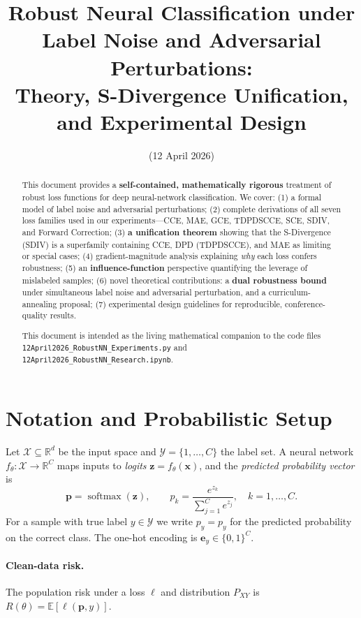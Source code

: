 \documentclass[11pt,a4paper]{article}
\title{\textbf{Robust Neural Classification under Label Noise and Adversarial Perturbations:}\\
Theory, S-Divergence Unification, and Experimental Design}
\author{(12 April 2026)}
\date{}
\newcommand{\softmax}{\operatorname{softmax}}
\newcommand{\R}{\mathbb{R}}
\newcommand{\E}{\mathbb{E}}
\newcommand{\py}{p_y}
\newcommand{\pb}{\mathbf{p}}
\newcommand{\zb}{\mathbf{z}}
\newcommand{\xb}{\mathbf{x}}
\newcommand{\eb}{\mathbf{e}}
\begin{document}
\maketitle

\begin{abstract}
This document provides a \textbf{self-contained, mathematically rigorous} treatment of robust loss functions for deep neural-network classification. We cover:
(1) a formal model of label noise and adversarial perturbations;
(2) complete derivations of all seven loss families used in our experiments—CCE, MAE, GCE, TDPDSCCE, SCE, SDIV, and Forward Correction;
(3) \textbf{a unification theorem} showing that the S-Divergence (SDIV) is a superfamily containing CCE, DPD (TDPDSCCE), and MAE as limiting or special cases;
(4) gradient-magnitude analysis explaining \emph{why} each loss confers robustness;
(5) an \textbf{influence-function} perspective quantifying the leverage of mislabeled samples;
(6) novel theoretical contributions: a \textbf{dual robustness bound} under simultaneous label noise and adversarial perturbation, and a curriculum-annealing proposal;
(7) experimental design guidelines for reproducible, conference-quality results.

This document is intended as the living mathematical companion to the code files
\texttt{12April2026\_RobustNN\_Experiments.py} and \texttt{12April2026\_RobustNN\_Research.ipynb}.
\end{abstract}

\tableofcontents
\newpage

\section{Notation and Probabilistic Setup}
\label{sec:notation}

Let $\mathcal{X} \subseteq \R^d$ be the input space and $\mathcal{Y} = \{1,\ldots,C\}$ the label set.
A neural network $f_\theta : \mathcal{X} \to \R^C$ maps inputs to \emph{logits} $\zb = f_\theta(\xb)$,
and the \emph{predicted probability vector} is
\[
  \pb = \softmax(\zb), \qquad p_k = \frac{e^{z_k}}{\sum_{j=1}^C e^{z_j}}, \quad k=1,\ldots,C.
\]
For a sample with true label $y \in \mathcal{Y}$ we write $\py = p_y$ for the predicted probability
on the correct class. The one-hot encoding is $\eb_y \in \{0,1\}^C$.

\paragraph{Clean-data risk.}
The population risk under a loss $\ell$ and distribution $P_{XY}$ is
$R(\theta) = \E[\ell(\pb, y)]$.
\end{document}
